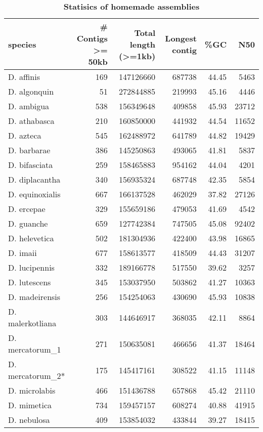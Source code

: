 \begin{table}

\caption{\textbf{Statisics of homemade assemblies}}
\centering
\begin{tabular}[t]{l|r|r|r|r|r}
\hline
species & \# Contigs >= 50kb & Total length (>=1kb) & Longest contig & \%GC & N50\\
\hline
D. affinis & 169 & 147126660 & 687738 & 44.45 & 5463\\
\hline
D. algonquin & 51 & 272844885 & 219993 & 45.16 & 4446\\
\hline
D. ambigua & 538 & 156349648 & 409858 & 45.93 & 23712\\
\hline
D. athabasca & 210 & 160850000 & 441932 & 44.54 & 11652\\
\hline
D. azteca & 545 & 162488972 & 641789 & 44.82 & 19429\\
\hline
D. barbarae & 386 & 145250863 & 493065 & 41.81 & 5837\\
\hline
D. bifasciata & 259 & 158465883 & 954162 & 44.04 & 4201\\
\hline
D. diplacantha & 340 & 156935324 & 687748 & 42.35 & 5854\\
\hline
D. equinoxialis & 667 & 166137528 & 462029 & 37.82 & 27126\\
\hline
D. ercepae & 329 & 155659186 & 479053 & 41.69 & 4542\\
\hline
D. guanche & 659 & 127742384 & 747505 & 45.08 & 92402\\
\hline
D. helevetica & 502 & 181304936 & 422400 & 43.98 & 16865\\
\hline
D. imaii & 677 & 158613577 & 418509 & 44.43 & 31207\\
\hline
D. lucipennis & 332 & 189166778 & 517550 & 39.62 & 3257\\
\hline
D. lutescens & 345 & 153037950 & 503862 & 41.27 & 10363\\
\hline
D. madeirensis & 256 & 154254063 & 430690 & 45.93 & 10838\\
\hline
D. malerkotliana & 303 & 144646917 & 368035 & 42.11 & 8864\\
\hline
D. mercatorum_1 & 271 & 150635081 & 466656 & 41.37 & 18464\\
\hline
D. mercatorum_2* & 175 & 145417161 & 308522 & 41.15 & 11148\\
\hline
D. microlabis & 466 & 151436788 & 657868 & 45.42 & 21110\\
\hline
D. mimetica & 734 & 159457157 & 608274 & 40.88 & 41915\\
\hline
D. nebulosa & 409 & 153854032 & 433844 & 39.27 & 18415\\

\end{tabular}
\end{table}
